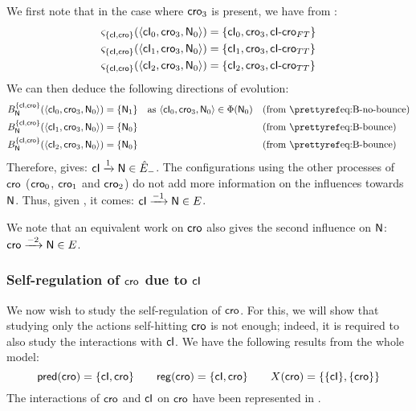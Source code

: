 We first note that in the case where $\mathsf{cro}_3$ is present, we have from :
\begin{align*}
  \varsigma_{\{ \mathsf{cI}, \mathsf{cro} \}}(\mbox{$\langle \mathsf{cI}_0, \mathsf{cro}_3, \mathsf{N}_0 \rangle$}) &= \{ \mathsf{cI}_0, \mathsf{cro}_3, \mathsf{cI\mbox{-}cro}_{FT} \} \\
  \varsigma_{\{ \mathsf{cI}, \mathsf{cro} \}}(\mbox{$\langle \mathsf{cI}_1, \mathsf{cro}_3, \mathsf{N}_0 \rangle$}) &= \{ \mathsf{cI}_1, \mathsf{cro}_3, \mathsf{cI\mbox{-}cro}_{TT} \} \\
  \varsigma_{\{ \mathsf{cI}, \mathsf{cro} \}}(\mbox{$\langle \mathsf{cI}_2, \mathsf{cro}_3, \mathsf{N}_0 \rangle$}) &= \{ \mathsf{cI}_2, \mathsf{cro}_3, \mathsf{cI\mbox{-}cro}_{TT} \}
\end{align*}
We can then deduce the following directions of evolution:
\begin{align*}
  \irB_\N^{\{ \cI, \cro \}}(\PHetat{\cI_0, \cro_3, \N_0}) &= \{ \N_1 \} &&
    \text{as } \PHetat{\cI_0, \cro_3, \N_0} \in \Phi(\N_0) &&
    \text{(from \pref{eq:B-no-bounce})} \\
  \irB_\N^{\{ \cI, \cro \}}(\PHetat{\cI_1, \cro_3, \N_0}) &= \{ \N_0 \} && &&
    \text{(from \pref{eq:B-bounce})} \\
  \irB_\N^{\{ \cI, \cro \}}(\PHetat{\cI_2, \cro_3, \N_0}) &= \{ \N_0 \} && &&
    \text{(from \pref{eq:B-bounce})}
\end{align*}
Therefore,  gives: $\mathsf{cI} \xrightarrow{1} \mathsf{N} \in \hat{E}_-$.
The configurations using the other processes of $\mathsf{cro}$ ($\mathsf{cro}_0$, $\mathsf{cro}_1$ and $\mathsf{cro}_2$)
do not add more information on the influences towards $\mathsf{N}$.
Thus, given , it comes: $\mathsf{cI} \xrightarrow{- 1} \mathsf{N} \in E$.

We note that an equivalent work on $\mathsf{cro}$ also gives the second influence on $\mathsf{N}$:
$\mathsf{cro} \xrightarrow{- 2} \mathsf{N} \in E$.



\subsubsection{Self-regulation of $\mathsf{cro}$ due to $\mathsf{cI}$}

We now wish to study the self-regulation of $\mathsf{cro}$.
For this, we will show that studying only the actions self-hitting $\mathsf{cro}$ is not enough;
indeed, it is required to also study the interactions with $\mathsf{cI}$.
We have the following results from the whole model:
\[\mathsf{pred}(\mathsf{cro}) = \{ \mathsf{cI}, \mathsf{cro} \} \qquad
  \mathsf{reg}({\mathsf{cro}}) = \{ \mathsf{cI}, \mathsf{cro} \} \qquad
  X(\mathsf{cro}) = \{ \{ \mathsf{cI} \}, \{ \mathsf{cro} \} \}\]
The interactions of $\mathsf{cro}$ and $\mathsf{cI}$ on $\mathsf{cro}$ have been represented in
.

